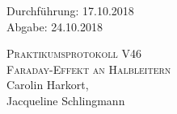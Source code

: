 

\begin{titlepage}
  \begin{flushleft}
 Durchführung: 17.10.2018\\
 Abgabe: 24.10.2018\\
  \end{flushleft}



 \begin{center}


\textsc{\LARGE Praktikumsprotokoll V46}\\[1.5cm]
\textsc{\huge Faraday-Effekt an Halbleitern} \\[5,5cm]

Carolin Harkort\footnotemark[1], \\
Jacqueline Schlingmann\footnotemark[2] \\[1,0cm]



 \end{center}

 \vfill

\end{titlepage}


  
  

\nocite{*}
\printbibliography

